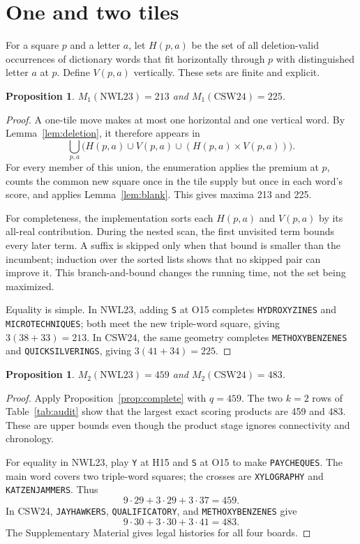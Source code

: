 \documentclass{article}
\theoremstyle{plain}
\newtheorem{proposition}[theorem]{Proposition}
\newcommand{\word}[1]{\texttt{#1}}
\begin{document}
\section{One and two tiles}

For a square $p$ and a letter $a$, let $H(p,a)$ be the set of all
deletion-valid occurrences of dictionary words that fit horizontally through
$p$ with distinguished letter $a$ at $p$. Define $V(p,a)$ vertically. These
sets are finite and explicit.

\begin{proposition}
$M_1(\mathrm{NWL23})=213$ and $M_1(\mathrm{CSW24})=225$.
\end{proposition}
\begin{proof}
A one-tile move makes at most one horizontal and one vertical word. By
Lemma~\ref{lem:deletion}, it therefore appears in
\[
 \bigcup_{p,a}\bigl(H(p,a)\cup V(p,a)\cup
                       (H(p,a)\times V(p,a))\bigr).
\]
For every member of this union, the enumeration applies the premium at $p$,
counts the common new square once in the tile supply but once in each word's
score, and applies Lemma~\ref{lem:blank}. This gives maxima 213 and 225.

For completeness, the implementation sorts each $H(p,a)$ and $V(p,a)$ by its
all-real contribution. During the nested scan, the first unvisited term bounds
every later term. A suffix is skipped only when that bound is smaller than the
incumbent; induction over the sorted lists shows that no skipped pair can
improve it. This branch-and-bound changes the running time, not the set being
maximized.

Equality is simple. In NWL23, adding \word{S} at O15 completes
\word{HYDROXYZINES} and \word{MICROTECHNIQUES}; both meet the new triple-word
square, giving $3(38+33)=213$. In CSW24, the same geometry completes
\word{METHOXYBENZENES} and \word{QUICKSILVERINGS}, giving
$3(41+34)=225$.
\end{proof}

\begin{proposition}
$M_2(\mathrm{NWL23})=459$ and $M_2(\mathrm{CSW24})=483$.
\end{proposition}
\begin{proof}
Apply Proposition~\ref{prop:complete} with $q=459$. The two $k=2$ rows of
Table~\ref{tab:audit} show that the largest exact scoring products are 459 and
483. These are upper bounds even though the product stage ignores connectivity
and chronology.

For equality in NWL23, play \word{Y} at H15 and \word{S} at O15 to make
\word{PAYCHEQUES}. The main word covers two triple-word squares; the crosses are
\word{XYLOGRAPHY} and \word{KATZENJAMMERS}. Thus
\[
 9\cdot29+3\cdot29+3\cdot37=459.
\]
In CSW24, \word{JAYHAWKERS}, \word{QUALIFICATORY}, and
\word{METHOXYBENZENES} give
\[
 9\cdot30+3\cdot30+3\cdot41=483.
\]
The Supplementary Material gives legal histories for all four boards.
\end{proof}
\end{document}
